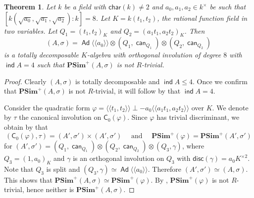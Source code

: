 \documentclass[twoside,11pt]{amsart}
\numberwithin{equation}{section}
\newtheorem{thm}[equation]{Theorem}
\theoremstyle{definition}
\newcommand\ind{\operatorname{\mathsf{ind}}}
\newcommand{\car}{\mathsf{char}}
\newcommand{\can}{\operatorname{\mathsf{can}}}
\newcommand{\vf}{\varphi}
\newcommand{\mg}[1]{{#1}^{\times}}
\newcommand{\sq}[1]{{#1}^{\times 2}}
\newcommand{\s}{\sigma}
\newcommand{\la}{\langle}
\newcommand{\ra}{\rangle}
\newcommand{\lla}{\la\!\la}
\newcommand{\rra}{\ra\!\ra}
\renewcommand{\leq}{\leqslant}
\newcommand\Ad{\operatorname{\mathsf{Ad}}}
\newcommand{\disc}{\mathsf{disc}}
\newcommand{\C}{\mathsf{C}}
\begin{document}
\begin{thm}\label{T:ind-4-non-R-trivial-ex}
    Let $k$ be a field with $\car(k)\neq 2$ and $a_0,a_1,a_2\in\mg{k}$ be such that $[k(\sqrt{a_0},\sqrt{a_1},\sqrt{a_2}):k]=8$.
    Let $K=k(t_1,t_2)$, the rational function field in two variables.
    Let $Q_1=(t_1,t_2)_K$ and $Q_2=(a_1t_1,a_2t_2)_K$.
    Then $$(A,\s)=\Ad\lla a_0\rra\otimes (Q_1,\can_{Q_1})\otimes (Q_2,\can_{Q_2})$$ is a totally decomposable $K$-algebra with orthogonal involution of degree $8$ with $\ind A=4$ 
    such that
    $\mathbf{PSim}^+(A,\s)$ is not $R$-trivial.
\end{thm}
\begin{proof}
Clearly $(A,\s)$ is totally decomposable and $\ind A\leq 4$.
Once we confirm that $\mathbf{PSim}^+(A,\s)$ is not $R$-trivial, it will follow by  that $\ind A=4$.

Consider the quadratic form $\vf=\lla t_1, t_2 \rra \perp -a_0\lla a_1t_1, a_2t_2 \rra$ over $K$.
We denote by $\tau$ the canonical involution on $\C_0(\vf)$.
Since $\vf$ has trivial discriminant, we obtain by  that 
\[(\C_0(\vf),\tau)= (A',\s')\times (A',\s')\quad\text{ and }\quad \mathbf{PSim}^+(\vf)=\mathbf{PSim}^+(A',\s')\]
for $(A',\s')=(Q_1,\can_{Q_1})\otimes (Q_2,\can_{Q_2})\otimes (Q_3,\gamma)$, where 
 $Q_3=(1,a_0)_K$ and $\gamma$ is an orthogonal involution on $Q_3$ with $\disc(\gamma)=a_0\sq{K}$.
Note that $Q_3$ is split and $(Q_3,\gamma)\simeq \Ad\lla a_0\rra$.
Therefore $(A',\s')\simeq (A,\s)$.
 This shows that
$\mathbf{PSim}^+(A,\s)\simeq \mathbf{PSim}^+(\vf)$.
By \cite[Theorem~7.5]{AB25}, $\mathbf{PSim}^+(\vf)$ is not $R$-trivial, hence neither is $\mathbf{PSim}^+(A,\s)$.
\end{proof}
\end{document}
